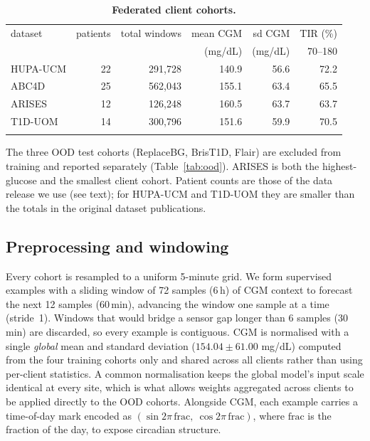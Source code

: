 \documentclass[10pt,letterpaper]{article}
\newlength\savedwidth
\newcommand\thickhline{\noalign{\global\savedwidth\arrayrulewidth\global\arrayrulewidth 2pt}%
\hline
\noalign{\global\arrayrulewidth\savedwidth}}
\begin{document}
\begin{table}[!ht]
\centering
\captionsetup{justification=centering,singlelinecheck=on}
\caption{\bf Federated client cohorts.}
\label{tab:datasets}
\begin{tabular}{lrrrrr}
\thickhline
dataset & patients & total windows & mean CGM & sd CGM & TIR (\%) \\
        &          &               & (mg/dL)  & (mg/dL) & 70--180  \\
\hline
HUPA-UCM & 22 & 291,728 & 140.9 & 56.6 & 72.2 \\
ABC4D    & 25 & 562,043 & 155.1 & 63.4 & 65.5 \\
ARISES   & 12 & 126,248 & 160.5 & 63.7 & 63.7 \\
T1D-UOM  & 14 & 300,796 & 151.6 & 59.9 & 70.5 \\
\thickhline
\end{tabular}
\begin{center}
{\small The three OOD test cohorts (ReplaceBG, BrisT1D, Flair) are excluded from
training and reported separately (Table~\ref{tab:ood}). ARISES is both the
highest-glucose and the smallest client cohort. Patient counts are those of the
data release we use (see text); for HUPA-UCM and T1D-UOM they are smaller than
the totals in the original dataset publications.}
\end{center}
\end{table}

\subsection*{Preprocessing and windowing}

Every cohort is resampled to a uniform 5-minute grid. We form supervised
examples with a sliding window of 72 samples (6\,h) of CGM context to forecast
the next 12 samples (60\,min), advancing the window one sample at a time
(stride~1). Windows that would bridge a sensor gap longer than 6 samples
(30\,min) are discarded, so every example is contiguous. CGM is normalised with
a single \emph{global} mean and standard deviation ($154.04 \pm 61.00$ mg/dL)
computed from the four training cohorts only and shared
across all clients rather than using per-client statistics. A common
normalisation keeps the global model's input scale identical at every site,
which is what allows weights aggregated across clients to be applied directly to
the OOD cohorts. Alongside CGM,
each example carries a time-of-day mark encoded
as $(\sin 2\pi\,\mathrm{frac},\ \cos 2\pi\,\mathrm{frac})$, where $\mathrm{frac}$
is the fraction of the day, to expose circadian structure.
\end{document}
